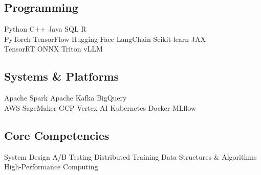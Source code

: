 \documentclass[../main.tex]{subfiles}
\begin{document}
\subsection{Programming}
Python \textbullet{} C++ \textbullet{} Java \textbullet{} SQL \textbullet{} R \\
PyTorch \textbullet{} TensorFlow \textbullet{} Hugging Face \textbullet{}
LangChain \textbullet{} Scikit-learn \textbullet{} JAX \\
TensorRT \textbullet{} ONNX \textbullet{} Triton \textbullet{} vLLM \\

\subsection{Systems \& Platforms}
Apache Spark \textbullet{} Apache Kafka \textbullet{} BigQuery \\
AWS SageMaker \textbullet{} GCP Vertex AI \textbullet{} Kubernetes \textbullet{}
Docker \textbullet{} MLflow \\

\subsection{Core Competencies}
System Design \textbullet{} A/B Testing \textbullet{} Distributed
Training \textbullet{} Data Structures \& Algorithms \textbullet{}
High-Performance Computing
\end{document}
